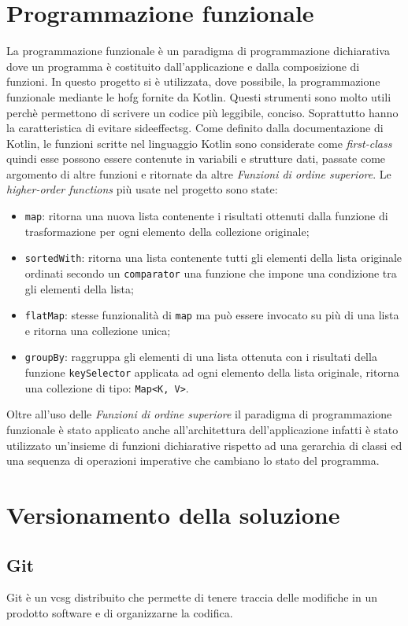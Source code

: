 \section{Programmazione funzionale}
La programmazione funzionale è un paradigma di programmazione dichiarativa dove un programma è costituito dall'applicazione e dalla composizione di funzioni. In questo progetto si è utilizzata, dove possibile, la programmazione funzionale mediante le \gls{hofg} fornite da Kotlin. Questi strumenti sono molto utili perchè permettono di scrivere un codice più leggibile, conciso. Soprattutto hanno la caratteristica di evitare \gls{sideeffectsg}. Come definito dalla documentazione di Kotlin, le funzioni scritte nel linguaggio Kotlin sono considerate come \emph{first-class} quindi esse possono essere contenute in variabili e strutture dati, passate come argomento di altre funzioni e ritornate da altre \emph{Funzioni di ordine superiore}. Le \emph{higher-order functions} più usate nel progetto sono state:
\begin{itemize}
	\item \verb|map|: ritorna una nuova lista contenente i risultati ottenuti dalla funzione di trasformazione per ogni elemento della collezione originale;
	\item \verb|sortedWith|: ritorna una lista contenente tutti gli elementi della lista originale ordinati secondo un \verb|comparator| una funzione che impone una condizione tra gli elementi della lista;
	\item \verb|flatMap|: stesse funzionalità di \verb|map| ma può essere invocato su più di una lista e ritorna una collezione unica;
	\item \verb|groupBy|: raggruppa gli elementi di una lista ottenuta con i risultati della funzione \verb|keySelector| applicata ad ogni elemento della lista originale, ritorna una collezione di tipo: \verb|Map<K, V>|.
\end{itemize}
Oltre all'uso delle \emph{Funzioni di ordine superiore} il paradigma di programmazione funzionale è stato applicato anche all'architettura dell'applicazione infatti è stato utilizzato un'insieme di funzioni dichiarative rispetto ad una gerarchia di classi ed una sequenza di operazioni imperative che cambiano lo stato del programma.

\section{Versionamento della soluzione}
\subsection{Git}
Git è un \gls{vcsg} distribuito che permette di tenere traccia delle modifiche in un prodotto software e di organizzarne la codifica. 

